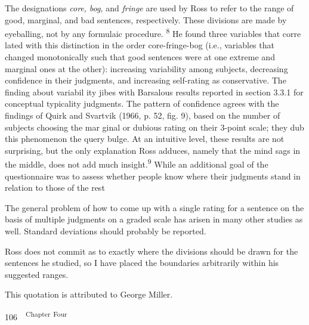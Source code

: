 \begin{styleTextbody}
The designations \textit{core,}\textit{ }\textit{bog,}\textit{ }and \textit{fringe}\textit{ }are used by Ross to refer to the range of good, marginal, and bad sentences, respectively. These divisions are made by eyeballing, not by any formulaic procedure. \textsuperscript{8}\textsuperscript{ }He found three variables that corre\- lated with this distinction in the order core-fringe-bog (i.e., variables that changed monotonically such that good sentences were at one extreme and marginal ones at the other): increasing variability among subjects, decreasing confidence in their judgments, and increasing self-rating as conservative. The finding about variabil\- ity jibes with Barsalou{\textquotesingle}s results reported in section 3.3.1 for conceptual typicality judgments. The pattern of confidence agrees with the findings of Quirk and Svartvik (1966, p. 52, fig. 9), based on the number of subjects choosing the {\textquotedbl}mar\- ginal or dubious{\textquotedbl} rating on their 3-point scale; they dub this phenomenon the {\textquotedbl}query bulge.{\textquotedbl} At an intuitive level, these results are not surprising, but the only explanation Ross adduces, namely that {\textquotedbl}the mind sags in the middle,{\textquotedbl} does not add much insight.\textsuperscript{9}\textsuperscript{ }While an additional goal of the questionnaire was to assess whether people know where their judgments stand in relation to those of the rest
\end{styleTextbody}


\begin{listWWNumxlileveli}
\item 
\begin{styleStandard}
The general problem of how to come up with a single rating for a sentence on the basis of multiple judgments on a graded scale has arisen in many other studies as well. Standard deviations should probably be reported.
\end{styleStandard}


\item 
\begin{styleStandard}
Ross does not commit as to exactly where the divisions should be drawn for the sentences he studied, so I have placed the boundaries arbitrarily within his suggested ranges.
\end{styleStandard}


\item 
\begin{styleStandard}
This quotation is attributed to George Miller.
\end{styleStandard}


\end{listWWNumxlileveli}
\clearpage\setcounter{page}{1}\begin{styleStandard}
106\ \ \textsuperscript{Chapter}\textsuperscript{ }\textsuperscript{Four}
\end{styleStandard}


